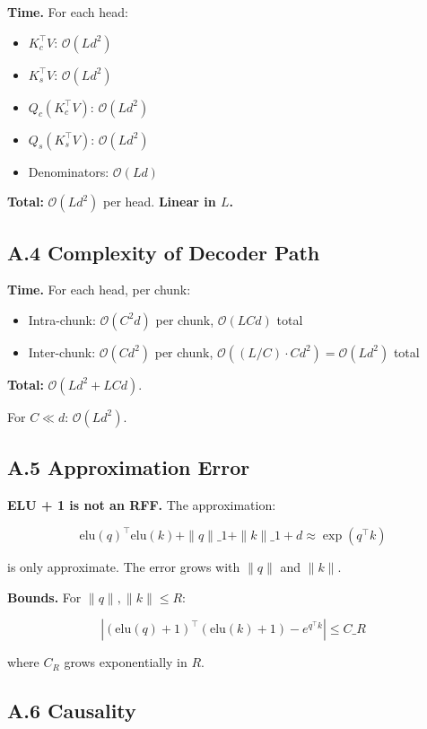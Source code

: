 \textbf{Time.} For each head:
\begin{itemize}
\item $K_c^\top V$: $\mathcal{O}(L d^2)$
\item $K_s^\top V$: $\mathcal{O}(L d^2)$
\item $Q_c (K_c^\top V)$: $\mathcal{O}(L d^2)$
\item $Q_s (K_s^\top V)$: $\mathcal{O}(L d^2)$
\item Denominators: $\mathcal{O}(L d)$

\end{itemize}
\textbf{Total:} $\mathcal{O}(L d^2)$ per head. \textbf{Linear in $L$.}

\subsection{A.4 Complexity of Decoder Path}

\textbf{Time.} For each head, per chunk:
\begin{itemize}
\item Intra-chunk: $\mathcal{O}(C^2 d)$ per chunk, $\mathcal{O}(L C d)$ total
\item Inter-chunk: $\mathcal{O}(C d^2)$ per chunk, $\mathcal{O}((L/C) \cdot C d^2) = \mathcal{O}(L d^2)$ total

\end{itemize}
\textbf{Total:} $\mathcal{O}(L d^2 + L C d)$.

For $C \ll d$: $\mathcal{O}(L d^2)$.

\subsection{A.5 Approximation Error}

\textbf{ELU + 1 is not an RFF.} The approximation:

\[
\text{elu}(q)^\top \text{elu}(k) + \|q\|\_1 + \|k\|\_1 + d \approx \exp(q^\top k)
\]

is only approximate. The error grows with $\|q\|$ and $\|k\|$.

\textbf{Bounds.} For $\|q\|, \|k\| \leq R$:

\[
\left|(\text{elu}(q)+1)^\top(\text{elu}(k)+1) - e^{q^\top k}\right| \leq C\_R
\]

where $C_R$ grows exponentially in $R$.

\subsection{A.6 Causality}

